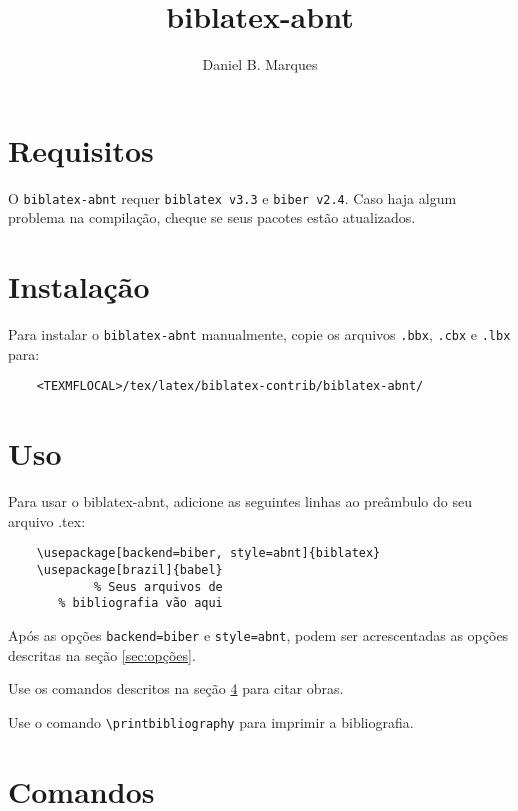 \documentclass[a4paper]{article}
\title{biblatex-abnt}
\author{Daniel B. Marques}
\begin{document}
\maketitle

\tableofcontents

\clearpage
\section{Requisitos}

O \texttt{biblatex-abnt} requer \texttt{biblatex v3.3} e \texttt{biber v2.4}. Caso haja algum problema na compilação, cheque se seus pacotes estão atualizados.

\section{Instalação}

Para instalar o \texttt{biblatex-abnt} manualmente, copie os arquivos \texttt{.bbx}, \texttt{.cbx} e \texttt{.lbx} para:
\begin{verbatim}
    <TEXMFLOCAL>/tex/latex/biblatex-contrib/biblatex-abnt/
\end{verbatim}

\section{Uso}

Para usar o {biblatex-abnt}, adicione as seguintes linhas ao preâmbulo do seu arquivo {.tex}:

\begin{verbatim}
    \usepackage[backend=biber, style=abnt]{biblatex}
    \usepackage[brazil]{babel}
            % Seus arquivos de
       % bibliografia vão aqui
\end{verbatim}

Após as opções \texttt{backend=biber} e \texttt{style=abnt}, podem ser acrescentadas as opções descritas na seção \ref{sec:opções}.

Use os comandos descritos na seção \ref{sec:comandos} para citar obras.

Use o comando \verb"\printbibliography" para imprimir a bibliografia.

\clearpage
\section{Comandos}
\label{sec:comandos}
\end{document}
